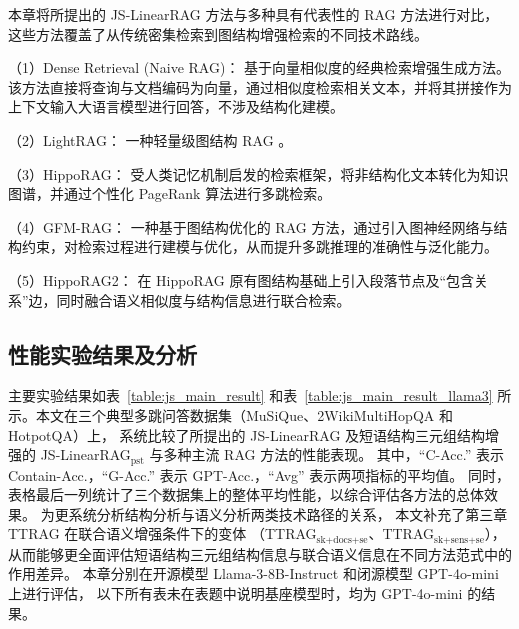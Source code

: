 本章将所提出的 JS-LinearRAG 方法与多种具有代表性的 RAG 方法进行对比，这些方法覆盖了从传统密集检索到图结构增强检索的不同技术路线。

（1）Dense Retrieval (Naive RAG)：
基于向量相似度的经典检索增强生成方法。
该方法直接将查询与文档编码为向量，通过相似度检索相关文本，并将其拼接作为上下文输入大语言模型进行回答，不涉及结构化建模。

（2）LightRAG\cite{lightrag}：
一种轻量级图结构 RAG 。

（3）HippoRAG\cite{hipporag}：
受人类记忆机制启发的检索框架，将非结构化文本转化为知识图谱，并通过个性化 PageRank 算法进行多跳检索。

（4）GFM-RAG\cite{gfm-rag}：
一种基于图结构优化的 RAG 方法，通过引入图神经网络与结构约束，对检索过程进行建模与优化，从而提升多跳推理的准确性与泛化能力。

（5）HippoRAG2\cite{hipporag2}：
在 HippoRAG 原有图结构基础上引入段落节点及“包含关系”边，同时融合语义相似度与结构信息进行联合检索。

\subsection{性能实验结果及分析}

主要实验结果如表~\ref{table:js_main_result} 和表~\ref{table:js_main_result_llama3} 所示。本文在三个典型多跳问答数据集（MuSiQue、2WikiMultiHopQA 和 HotpotQA）上，
系统比较了所提出的 JS-LinearRAG 及短语结构三元组结构增强的 JS-LinearRAG$_{\text{pst}}$ 与多种主流 RAG 方法的性能表现。
其中，“C-Acc.” 表示 Contain-Acc.，“G-Acc.” 表示 GPT-Acc.，“Avg” 表示两项指标的平均值。
同时，表格最后一列统计了三个数据集上的整体平均性能，以综合评估各方法的总体效果。
为更系统分析结构分析与语义分析两类技术路径的关系，
本文补充了第三章 TTRAG 在联合语义增强条件下的变体
（TTRAG$_{\text{sk+docs+se}}$、TTRAG$_{\text{sk+sens+se}}$），
从而能够更全面评估短语结构三元组结构信息与联合语义信息在不同方法范式中的作用差异。
本章分别在开源模型 Llama-3-8B-Instruct 和闭源模型 GPT-4o-mini 上进行评估，
以下所有表未在表题中说明基座模型时，均为 GPT-4o-mini 的结果。

